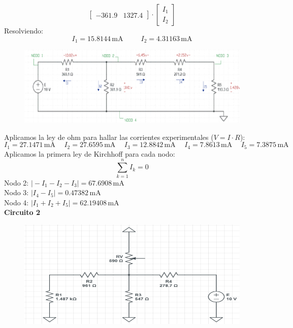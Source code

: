 \documentclass[a4paper,12pt]{report}
\begin{document}
\begin{enumerate}
$$\begin{bmatrix}
-361.9 & 1327.4
\end{bmatrix} \cdot \begin{bmatrix}
I_{1}\\
I_{2}
\end{bmatrix}
$$
Resolviendo:
$$
I_{1} = 15.8144\,\mathrm{mA} \hspace{30pt} I_{2} = 4.31163\,\mathrm{mA}
$$
\begin{figure}[H]
\begin{center}
\includegraphics[scale=0.5]{sergodcirc1,3.png}
\end{center}
\end{figure}
Aplicamos la ley de ohm para hallar las corrientes experimentales ($V = I \cdot R$):
$$
I_{1} = 27.1471\,\mathrm{mA} \hspace{15pt} I_{2} = 27.6595\,\mathrm{mA} \hspace{15pt} I_{3}=12.8842\,\mathrm{mA} \hspace{15pt} I_{4} = 7.8613\,\mathrm{mA} \hspace{15pt} I_{5} = 7.3875\,\mathrm{mA}
$$
Aplicamos la primera ley de Kirchhoff para cada nodo:
$$
\sum_{k=1}^{n} I_{k} = 0
$$
Nodo 2: $\vert -I_{1} - I_{2} - I_{3} \vert  = 67.6908\,\mathrm{mA}$\\
Nodo 3: $\vert I_{4} - I_{5} \vert  = 0.47382\,\mathrm{mA}$\\
Nodo 4: $\vert I_{1} + I_{2} + I_{5} \vert  = 62.19408\,\mathrm{mA}$\\
\textbf{Circuito 2}\\
\begin{figure}[H]
\begin{center}
\includegraphics[scale=0.55]{sergodcirc2,1.png}

\end{center}
\end{figure}
\end{enumerate}
\end{document}
